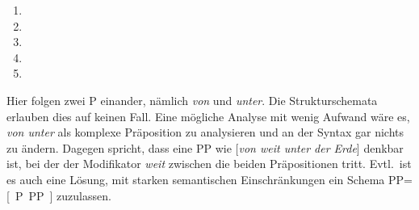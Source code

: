 \begin{enumerate}
  \item {}
  \item {}
  \item {}
  \item {}
  \item {}
\end{enumerate}


Hier folgen zwei P einander, nämlich \textit{von} und \textit{unter}.
Die Strukturschemata erlauben dies auf keinen Fall.
Eine mögliche Analyse mit wenig Aufwand wäre es, \textit{von unter} als komplexe Präposition zu analysieren und an der Syntax gar nichts zu ändern.
Dagegen spricht, dass eine PP wie [\textit{von weit unter der Erde}] denkbar ist, bei der der Modifikator \textit{weit} zwischen die beiden Präpositionen tritt.
Evtl.\ ist es auch eine Lösung, mit starken semantischen Einschränkungen ein Schema PP=[~P~PP~] zuzulassen.


